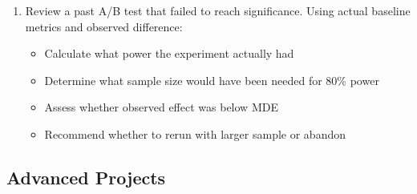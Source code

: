 \begin{enumerate}
    \item Review a past A/B test that failed to reach significance. Using actual baseline metrics and observed difference:
    \begin{itemize}
        \item Calculate what power the experiment actually had
        \item Determine what sample size would have been needed for 80\% power
        \item Assess whether observed effect was below MDE
        \item Recommend whether to rerun with larger sample or abandon
    \end{itemize}
\end{enumerate}

\subsection{Advanced Projects}

